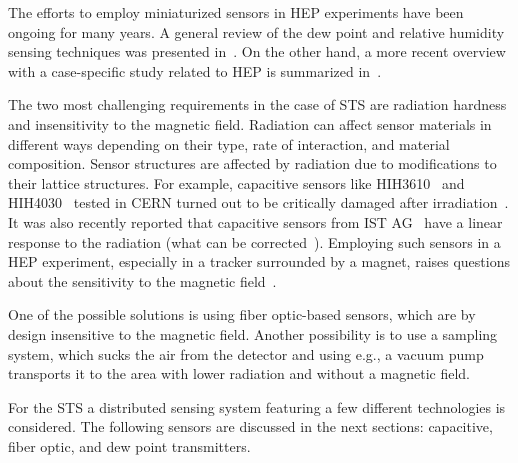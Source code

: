 The efforts to employ miniaturized sensors in \gls{HEP} experiments have been ongoing for many years. A general review of the dew point and relative humidity sensing techniques was presented in~\cite{RITTERSMA}. On the other hand, a more recent overview with a case-specific study related to \gls{HEP} is summarized in~\cite{Kapic}. 

The two most challenging requirements in the case of \gls{STS} are radiation hardness and insensitivity to the magnetic field. Radiation can affect sensor materials in different ways depending on their type, rate of interaction, and material composition. Sensor structures are affected by radiation due to modifications to their lattice structures. For example, capacitive sensors like HIH3610~\cite{HIH3610} and HIH4030~\cite{HIH4030} tested in CERN turned out to be critically damaged after irradiation~\cite{Berruti}. It was also recently reported that capacitive sensors from IST AG~\cite{MK33} have a linear response to the radiation (what can be corrected~\cite{Kapic_sensor}). Employing such sensors in a \gls{HEP} experiment, especially in a tracker surrounded by a magnet, raises questions about the sensitivity to the magnetic field~\cite{Berruti}. 

One of the possible solutions is using fiber optic-based sensors, which are by design insensitive to the magnetic field. Another possibility is to use a sampling system, which sucks the air from the detector and using e.g., a vacuum pump transports it to the area with lower radiation and without a magnetic field.

For the \gls{STS} a distributed sensing system featuring a few different technologies is considered. The following sensors are discussed in the next sections: capacitive, fiber optic, and dew point transmitters. 


